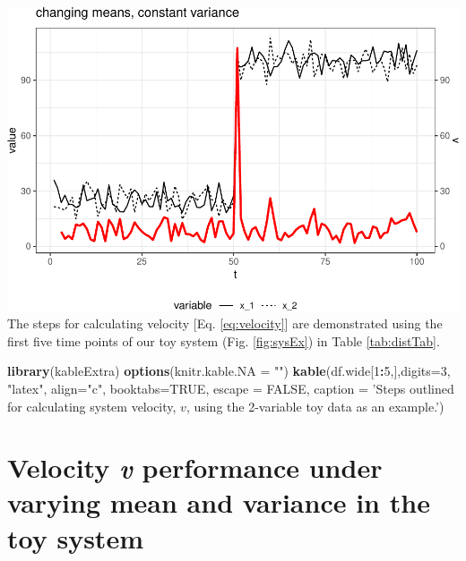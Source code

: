 \documentclass[12pt,twoside,openany]{reedthesis}
\newenvironment{Shaded}{\begin{snugshade}}{\end{snugshade}}
\newcommand{\DataTypeTok}[1]{\textcolor[rgb]{0.13,0.29,0.53}{#1}}
\newcommand{\DecValTok}[1]{\textcolor[rgb]{0.00,0.00,0.81}{#1}}
\newcommand{\KeywordTok}[1]{\textcolor[rgb]{0.13,0.29,0.53}{\textbf{#1}}}
\newcommand{\NormalTok}[1]{#1}
\newcommand{\OperatorTok}[1]{\textcolor[rgb]{0.81,0.36,0.00}{\textbf{#1}}}
\newcommand{\OtherTok}[1]{\textcolor[rgb]{0.56,0.35,0.01}{#1}}
\newcommand{\StringTok}[1]{\textcolor[rgb]{0.31,0.60,0.02}{#1}}
\begin{document}
\includegraphics{_myDissertation_files/figure-latex/velocSysEx1-1.pdf}
The steps for calculating velocity {[}Eq. \eqref{eq:velocity}{]} are demonstrated using the first five time points of our toy system (Fig. \ref{fig:sysEx}) in Table \ref{tab:distTab}.
\begin{Shaded}
\begin{Highlighting}[]
\KeywordTok{library}\NormalTok{(kableExtra)}
\KeywordTok{options}\NormalTok{(}\DataTypeTok{knitr.kable.NA =} \StringTok{""}\NormalTok{)}
\KeywordTok{kable}\NormalTok{(df.wide[}\DecValTok{1}\OperatorTok{:}\DecValTok{5}\NormalTok{,],}\DataTypeTok{digits=}\DecValTok{3}\NormalTok{, }\StringTok{"latex"}\NormalTok{, }\DataTypeTok{align=}\StringTok{"c"}\NormalTok{, }\DataTypeTok{booktabs=}\OtherTok{TRUE}\NormalTok{, }\DataTypeTok{escape =} \OtherTok{FALSE}\NormalTok{, }
            \DataTypeTok{caption =} \StringTok{'Steps outlined for calculating system velocity, $v$, using the 2-variable toy data as an example.'}\NormalTok{)}
\end{Highlighting}
\end{Shaded}
\hypertarget{velocity-v-performance-under-varying-mean-and-variance-in-the-toy-system}{%
\section{\texorpdfstring{Velocity \emph{v} performance under varying mean and variance in the toy system}{Velocity v performance under varying mean and variance in the toy system}}\label{velocity-v-performance-under-varying-mean-and-variance-in-the-toy-system}}
\end{document}
